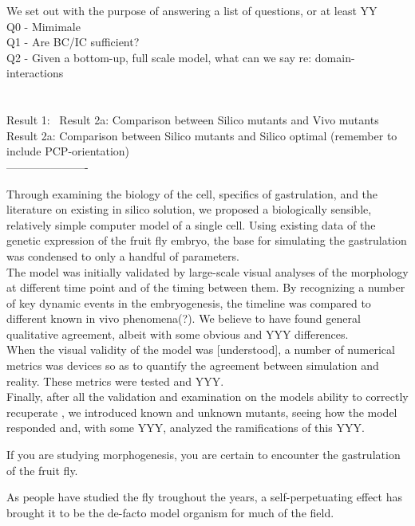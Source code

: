 We set out with the purpose of answering a list of questions, or at least YY\\

Q0 - Mimimale\\
Q1 - Are BC/IC sufficient?\\
Q2 - Given a bottom-up, full scale model, what can we say re: domain-interactions\\
\\\\
Result 1: \
Result 2a: Comparison between Silico mutants and Vivo mutants\\
Result 2a: Comparison between Silico mutants and Silico optimal (remember to include PCP-orientation)\\

----------------------

Through examining the biology of the cell, specifics of gastrulation, and the literature on existing in silico solution, we proposed a biologically sensible, relatively simple computer model of a single cell. Using existing data of the genetic expression of the fruit fly embryo, the base for simulating the gastrulation was condensed to only a handful of parameters. \\

The model was initially validated by large-scale visual analyses of the morphology at different time point and of the timing between them. By recognizing a number of key dynamic events in the embryogenesis, the timeline was compared to different known in vivo phenomena(?). We believe to have found general qualitative agreement, albeit with some obvious and YYY differences.\\ 

When the visual validity of the model was [understood], a number of numerical metrics was devices so as to quantify the agreement between simulation and reality. These metrics were tested and YYY.\\

Finally, after all the validation and examination on the models ability to correctly recuperate , we introduced known and unknown mutants, seeing how the model responded and, with some YYY, analyzed the ramifications of this YYY. 




If you are studying morphogenesis, you are certain to encounter the gastrulation of the fruit fly.

As people have studied the fly troughout the years, a self-perpetuating effect has brought it to be the de-facto model organism for much of the field. 

